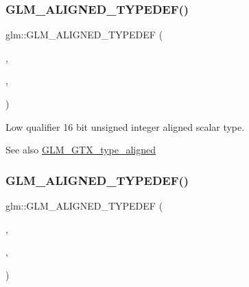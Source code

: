 \subsubsection{\texorpdfstring{G\+L\+M\+\_\+\+A\+L\+I\+G\+N\+E\+D\+\_\+\+T\+Y\+P\+E\+D\+E\+F()}{GLM\_ALIGNED\_TYPEDEF()}\hspace{0.1cm}{\footnotesize\ttfamily [70/209]}}
{\footnotesize\ttfamily glm\+::\+G\+L\+M\+\_\+\+A\+L\+I\+G\+N\+E\+D\+\_\+\+T\+Y\+P\+E\+D\+EF (\begin{DoxyParamCaption}\item[{\hyperlink{group__gtc__type__precision_ga9b8409887319f62f06e664f6ca121b9d}{lowp\+\_\+uint16}}]{,  }\item[{aligned\+\_\+lowp\+\_\+uint16}]{,  }\item[{2}]{ }\end{DoxyParamCaption})}

Low qualifier 16 bit unsigned integer aligned scalar type. \begin{DoxySeeAlso}{See also}
\hyperlink{group__gtx__type__aligned}{G\+L\+M\+\_\+\+G\+T\+X\+\_\+type\+\_\+aligned} 
\end{DoxySeeAlso}
\mbox{\label{group__gtx__type__aligned_ga7a5009a1d0196bbf21dd7518f61f0249}} 
\subsubsection{\texorpdfstring{G\+L\+M\+\_\+\+A\+L\+I\+G\+N\+E\+D\+\_\+\+T\+Y\+P\+E\+D\+E\+F()}{GLM\_ALIGNED\_TYPEDEF()}\hspace{0.1cm}{\footnotesize\ttfamily [71/209]}}
{\footnotesize\ttfamily glm\+::\+G\+L\+M\+\_\+\+A\+L\+I\+G\+N\+E\+D\+\_\+\+T\+Y\+P\+E\+D\+EF (\begin{DoxyParamCaption}\item[{\hyperlink{group__gtc__type__precision_gaf11e85af414720b4cd12bd57b3a81e68}{lowp\+\_\+uint32}}]{,  }\item[{aligned\+\_\+lowp\+\_\+uint32}]{,  }\item[{4}]{ }\end{DoxyParamCaption})}

